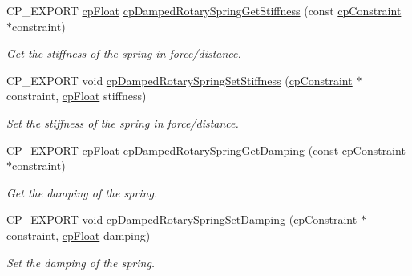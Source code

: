 \begin{DoxyCompactItemize}
C\+P\+\_\+\+E\+X\+P\+O\+RT \mbox{\hyperlink{group__basic_types_gac1ed65573e035bf892505768c852d8d3}{cp\+Float}} \mbox{\hyperlink{group__cp_damped_rotary_spring_ga0bdc853bacf56c54c246daa0fb40be62}{cp\+Damped\+Rotary\+Spring\+Get\+Stiffness}} (const \mbox{\hyperlink{structcp_constraint}{cp\+Constraint}} $\ast$constraint)
\begin{DoxyCompactList}\small\item\em Get the stiffness of the spring in force/distance. \end{DoxyCompactList}\item 
\mbox{\label{group__cp_damped_rotary_spring_ga2da549aff945710a181b704b3a57a6f3}} 
C\+P\+\_\+\+E\+X\+P\+O\+RT void \mbox{\hyperlink{group__cp_damped_rotary_spring_ga2da549aff945710a181b704b3a57a6f3}{cp\+Damped\+Rotary\+Spring\+Set\+Stiffness}} (\mbox{\hyperlink{structcp_constraint}{cp\+Constraint}} $\ast$constraint, \mbox{\hyperlink{group__basic_types_gac1ed65573e035bf892505768c852d8d3}{cp\+Float}} stiffness)
\begin{DoxyCompactList}\small\item\em Set the stiffness of the spring in force/distance. \end{DoxyCompactList}\item 
\mbox{\label{group__cp_damped_rotary_spring_gaaee99f98580f2b93abb35b5b386e176f}} 
C\+P\+\_\+\+E\+X\+P\+O\+RT \mbox{\hyperlink{group__basic_types_gac1ed65573e035bf892505768c852d8d3}{cp\+Float}} \mbox{\hyperlink{group__cp_damped_rotary_spring_gaaee99f98580f2b93abb35b5b386e176f}{cp\+Damped\+Rotary\+Spring\+Get\+Damping}} (const \mbox{\hyperlink{structcp_constraint}{cp\+Constraint}} $\ast$constraint)
\begin{DoxyCompactList}\small\item\em Get the damping of the spring. \end{DoxyCompactList}\item 
\mbox{\label{group__cp_damped_rotary_spring_gacebcb68e260afa9d2e1739acfdadea1d}} 
C\+P\+\_\+\+E\+X\+P\+O\+RT void \mbox{\hyperlink{group__cp_damped_rotary_spring_gacebcb68e260afa9d2e1739acfdadea1d}{cp\+Damped\+Rotary\+Spring\+Set\+Damping}} (\mbox{\hyperlink{structcp_constraint}{cp\+Constraint}} $\ast$constraint, \mbox{\hyperlink{group__basic_types_gac1ed65573e035bf892505768c852d8d3}{cp\+Float}} damping)
\begin{DoxyCompactList}\small\item\em Set the damping of the spring. \end{DoxyCompactList}\item 

\end{DoxyCompactItemize}
